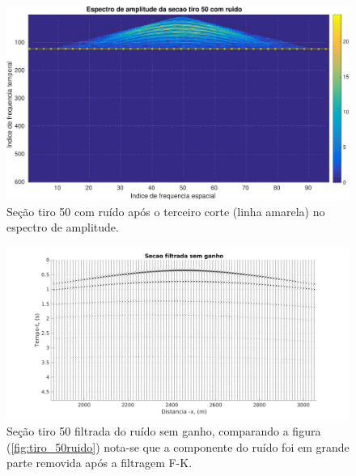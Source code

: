 \begin{landscape}
\begin{figure}[H]
\centering
\includegraphics[totalheight=14cm]{figuras/cap2/espc_tiro50_c3.pdf}
\caption{Seção tiro 50 com ruído após o terceiro corte (linha amarela) no espectro de amplitude.}
\label{fig:espc_tiro50_c3}
\end{figure}
\end{landscape}

\begin{landscape}
\begin{figure}[H]
\centering
\includegraphics[totalheight=14cm]{figuras/cap2/secao_filtrada.pdf}
\caption{Seção tiro 50 filtrada do ruído sem ganho, comparando a figura (\ref{fig:tiro_50ruido}) nota-se que a componente do ruído foi em grande parte removida após a filtragem F-K.}
\label{fig:secao_filtrada}
\end{figure}
\end{landscape}

